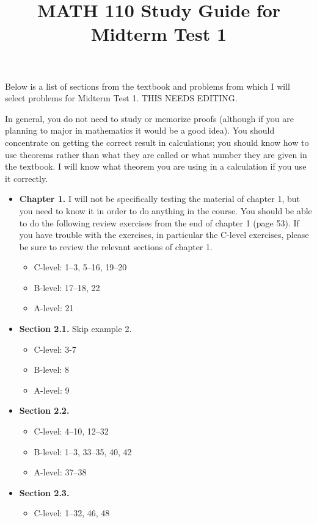 \documentclass[11pt]{article}
\title{MATH 110 Study Guide for Midterm Test 1}
\author{\commonAuthor}
\date{\commonDateMTOne}
\begin{document}
\maketitle

Below is a list of sections from the textbook
and problems from which I will select problems for
Midterm Test 1.  THIS NEEDS EDITING. %

In general, you do not need to study or memorize proofs (although if
you are planning to major in mathematics it would be a good idea).
You should concentrate on getting the correct result in calculations;
you should know how to use theorems rather than what they are called
or what number they are given in the textbook.  I will know what
theorem you are using in a calculation if you use it correctly.

\begin{itemize}
\item \textbf{Chapter 1.}
  I will not be specifically testing the material of chapter 1, but you
  need to know it in order to do anything in the course.
  You should be able to do the following review exercises from the end
  of chapter 1 (page 53).  If you
  have trouble with the exercises, in particular the C-level exercises,
  please be sure to review the relevant sections of chapter 1.
  \begin{itemize}
  \item C-level: 1--3, 5--16, 19--20
  \item B-level: 17--18, 22
  \item A-level: 21
  \end{itemize}
\item \textbf{Section 2.1.} Skip example 2.
  \begin{itemize}
  \item C-level: 3-7
  \item B-level: 8
  \item A-level: 9
  \end{itemize}
\item \textbf{Section 2.2.}
  \begin{itemize}
  \item C-level: 4--10, 12--32
  \item B-level: 1--3, 33--35, 40, 42
  \item A-level: 37--38
  \end{itemize}
\item \textbf{Section 2.3.}
  \begin{itemize}
  \item C-level: 1--32, 46, 48

\end{itemize}
\end{itemize}
\end{document}
